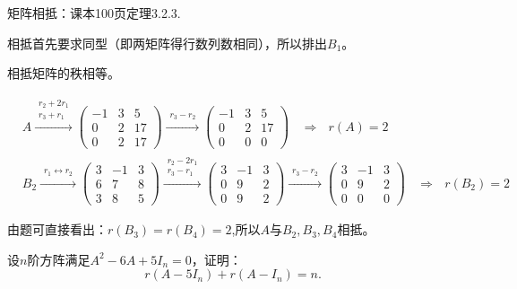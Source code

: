\documentclass[a4paper]{report}
\begin{document}
\begin{jie}
\textcolor[rgb]{1.00,0.00,0.00}{矩阵相抵：课本100页定理3.2.3}.

相抵首先要求同型（即两矩阵得行数列数相同），所以排出$B_1$。

相抵矩阵的秩相等。

\begin{align*}
&A\xrightarrow{\substack{r_{2}+2r_1\\ r_3+r_1}}
{
\begin{pmatrix}
-1&3&5\\
0&2&17\\
0&2&17
\end{pmatrix}
}\xrightarrow{\substack{r_{3}-r_2}}
{
\begin{pmatrix}
-1&3&5\\
0&2&17\\
0&0&0
\end{pmatrix}
}~~~~\Rightarrow~~~r(A)=2\\
&B_2\xrightarrow{\substack{r_{1}\leftrightarrow r_2}}
{
\begin{pmatrix}
3&-1&3\\
6&7&8\\
3&8&5
\end{pmatrix}
}\xrightarrow{\substack{r_{2}-2 r_1\\ r_3-r_1}}
{
\begin{pmatrix}
3&-1&3\\
0&9&2\\
0&9&2
\end{pmatrix}
}\xrightarrow{\substack{r_{3}-r_2}}
{
\begin{pmatrix}
3&-1&3\\
0&9&2\\
0&0&0
\end{pmatrix}
}~~~~\Rightarrow~~~r(B_2)=2
\end{align*}

由题可直接看出：$r(B_3)=r(B_4)=2$,所以$A$与$B_2,B_3,B_4$相抵。
\end{jie}

\EX 设$n$阶方阵满足$A^2-6A+5I_{n}=0$，证明：
\begin{equation*}
  r(A-5I_{n})+r(A-I_{n})=n.
\end{equation*}
\end{document}
